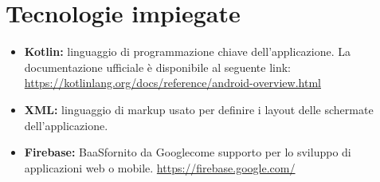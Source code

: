 \section{Tecnologie impiegate}
\begin{itemize}
	\item \textbf{Kotlin\glo:} linguaggio di programmazione chiave dell'applicazione. La documentazione ufficiale è disponibile al seguente link:
	\newline \url{https://kotlinlang.org/docs/reference/android-overview.html}
	\item \textbf{XML\glosp:} linguaggio di markup usato per definire i layout delle schermate dell'applicazione.
	\item \textbf{Firebase\glo:} BaaS\glosp fornito da Google\glosp come supporto per lo sviluppo di applicazioni web o mobile.
	\newline \url{https://firebase.google.com/}
\end{itemize}
